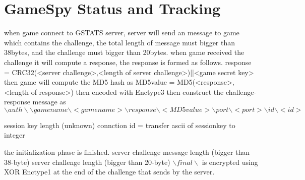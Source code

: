 \documentclass[oneside,titlepage,a4paper]{Definition/retrospy} %
\begin{document}
\section{GameSpy Status and Tracking}
when game connect to GSTATS server, server will send an message to game which contains the challenge, the total length of message must bigger than 38bytes, and the challenge must bigger than 20bytes.
when game received the challenge it will compute a response, the response is formed as follows. 
response = CRC32(<server challenge>,<length of server challenge>)||<game secret key>
then game will compute the MD5 hash as MD5value = MD5(<response>,<length of response>)
then encoded with Enctype3
then construct the challenge-response message as $ \backslash auth \backslash \backslash gamename \backslash <gamename>\backslash response \backslash <MD5value> \backslash port \backslash <port> \backslash id \backslash <id> $

session key length (unknown)
connction id = transfer ascii of sessionkey to integer

the initialization phase is finished.
server challenge message length (bigger than 38-byte)
server challenge length (bigger than 20-byte)
$ \backslash final \backslash $ is encrypted using XOR Enctype1 at the end of the challenge that sends by the server.
\end{document}
